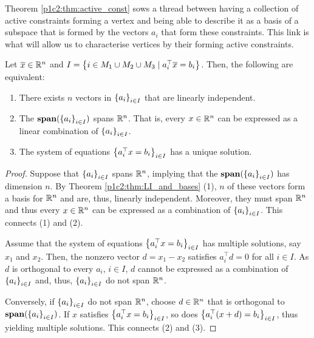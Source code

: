 Theorem \ref{p1c2:thm:active_const} sows a thread between having a collection of active constraints forming a vertex and being able to describe it as a basis of a subspace that is formed by the vectors $a_i$ that form these constraints. This link is what will allow us to characterise vertices by their forming active constraints.

\begin{theorem}\label{p1c2:thm:active_const}
	Let $\overline{x} \in \mathbb{R}^n$ and $I = \left\{  i \in M_1 \cup M_2 \cup M_3 \mid a_i^\top \overline{x} = b_i \right \}$. Then, the following are equivalent:
	\begin{enumerate}
		\item There exists $n$ vectors in $\left\{ a_i \right \}_{i \in I}$ that are linearly independent.  
		\item The $\mathop{\bf span}(\left\{ a_i \right \}_{i \in I})$ spans $\mathbb{R}^n$. That is, every $x \in \mathbb{R}^n$ can be expressed as a linear combination of $\left\{ a_i \right \}_{i \in I}$.
		\item The system of equations $\left\{ a_i ^\top x = b_i \right \}_{i \in I}$ has a unique solution.
	\end{enumerate}
\end{theorem}

\begin{proof}
	Suppose that $\left\{ a_i \right \}_{i \in I}$ spans $\mathbb{R}^n$, implying that the $\mathop{\bf span}(\left\{ a_i \right \}_{i \in I})$ has dimension $n$. By Theorem \ref{p1c2:thm:LI_and_bases} (1), $n$ of these vectors form a basis for $\mathbb{R}^n$ and are, thus, linearly independent. Moreover, they must span $\mathbb{R}^n$ and thus every $x \in \mathbb{R}^n$ can be expressed as a combination of $\left\{ a_i \right \}_{i \in I}$. This connects (1) and (2).
	
	Assume that the system of equations $\left\{ a_i ^\top x = b_i \right \}_{i \in I}$ has multiple solutions, say $x_1$ and $x_2$. Then, the nonzero vector $d = x_1 - x_2$ satisfies $a_i^\top d = 0$ for all $i \in I$. As $d$ is orthogonal to every $a_i$, $i \in I$, $d$ cannot be expressed as a combination of $\left\{ a_i \right \}_{i \in I}$ and, thus, $\left\{ a_i \right \}_{i \in I}$ do not span $\mathbb{R}^n$.
	
	Conversely, if $\left\{ a_i \right \}_{i \in I}$ do not span $\mathbb{R}^n$, choose $d \in \mathbb{R}^n$ that is orthogonal to $\mathop{\bf span}(\left\{ a_i \right \}_{i \in I})$. If $x$ satisfies $\left\{ a_i ^\top x = b_i \right \}_{i \in I}$, so does $\left\{ a_i ^\top (x + d) = b_i \right \}_{i \in I}$, thus yielding multiple solutions. This connects (2) and (3). \qedhere
\end{proof}

